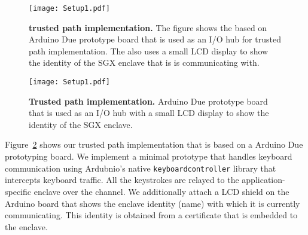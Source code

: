 
\begin{figure}[t]
  \centering
    \texttt{[image: Setup1.pdf]}
    \caption{\textbf{\name trusted path implementation.} The figure shows the \device based on Arduino Due prototype board that is used as an I/O hub for trusted path implementation. The \device also uses a small LCD display to show the identity of the SGX enclave that is is communicating with.}
   \figsaver
    \label{fig:trustedPathImplementation}
\end{figure}
\fi


\begin{figure}[t]
  \centering
    \texttt{[image: Setup1.pdf]}
    \caption{\textbf{Trusted path implementation.} Arduino Due prototype board that is used as an I/O hub with a small LCD display to show the identity of the SGX enclave.}
   \figsaver
    \label{fig:trustedPathImplementation}
\end{figure}

Figure~\ref{fig:trustedPathImplementation} shows our trusted path implementation that is based on a Arduino Due prototyping board. We implement a minimal prototype that handles keyboard communication using Ardubnio's native \texttt{keyboardcontroller} library that intercepts keyboard traffic. All the keystrokes are relayed to the application-specific enclave over the \tls channel. 
%
We additionally attach a LCD shield on the Arduino board that shows the enclave identity (name) with which it is currently communicating. This identity is obtained from a certificate that is embedded to the enclave.




